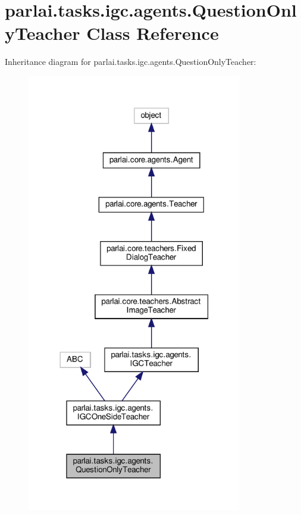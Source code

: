 \hypertarget{classparlai_1_1tasks_1_1igc_1_1agents_1_1QuestionOnlyTeacher}{}\section{parlai.\+tasks.\+igc.\+agents.\+Question\+Only\+Teacher Class Reference}
\label{classparlai_1_1tasks_1_1igc_1_1agents_1_1QuestionOnlyTeacher}


Inheritance diagram for parlai.\+tasks.\+igc.\+agents.\+Question\+Only\+Teacher\+:
\nopagebreak
\begin{figure}[H]
\begin{center}
\leavevmode
\includegraphics[width=266pt]{d1/db6/classparlai_1_1tasks_1_1igc_1_1agents_1_1QuestionOnlyTeacher__inherit__graph}
\end{center}
\end{figure}


